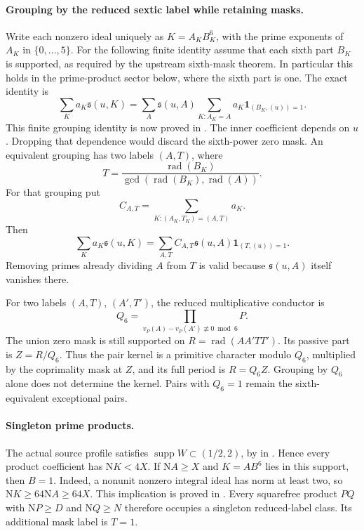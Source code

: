 \documentclass[11pt]{article}
\newcommand{\Nm}{\mathrm N}
\newcommand{\rad}{\operatorname{rad}}
\begin{document}
\paragraph{Grouping by the reduced sextic label while retaining masks.}
Write each nonzero ideal uniquely as \(K=A_K B_K^6\), with the
prime exponents of \(A_K\) in \(\{0,\ldots,5\}\).
For the following finite identity assume that each sixth part
\(B_K\) is supported, as required by the upstream sixth-mask theorem.
In particular this holds in the prime-product sector below, where
the sixth part is one. The exact identity is
\[
 \sum_K a_K\mathfrak s(u,K)
 =\sum_A\mathfrak s(u,A)
       \sum_{K:A_K=A}a_K\mathbf1_{(B_K,(u))=1}.
\]
This finite grouping identity is now proved in
.
The inner coefficient depends on \(u\). Dropping that dependence
would discard the sixth-power zero mask.
An equivalent grouping has two labels \((A,T)\), where
\[
 T=\frac{\rad(B_K)}{\gcd(\rad(B_K),\rad(A))}.
\]
For that grouping put
\[
 C_{A,T}=\sum_{K:(A_K,T_K)=(A,T)}a_K.
\]
Then
\[
 \sum_K a_K\mathfrak s(u,K)
 =\sum_{A,T}C_{A,T}\mathfrak s(u,A)
                    \mathbf1_{(T,(u))=1}.
\]
Removing primes already dividing \(A\) from \(T\) is valid because
\(\mathfrak s(u,A)\) itself vanishes there.

For two labels \((A,T)\), \((A',T')\), the reduced multiplicative
conductor is
\[
 Q_6=\prod_{v_P(A)-v_P(A')\not\equiv0\bmod6}P.
\]
The union zero mask is still supported on
\(R=\rad(AA'TT')\). Its passive part is \(Z=R/Q_6\).
Thus the pair kernel is a primitive character modulo \(Q_6\),
multiplied by the coprimality mask at \(Z\), and its full period is
\(R=Q_6Z\). Grouping by \(Q_6\) alone does not determine the kernel.
Pairs with \(Q_6=1\) remain the sixth-equivalent exceptional pairs.

\paragraph{Singleton prime products.}
The actual source profile satisfies
\(\operatorname{supp}W\subset(1/2,2)\), by
in .
Hence every product coefficient has \(\Nm K<4X\).
If \(\Nm A\ge X\) and \(K=A B^6\) lies in this support, then
\(B=1\). Indeed, a nonunit nonzero integral ideal has norm at least
two, so \(\Nm K\ge64\Nm A\ge64X\).
This implication is proved in
.
Every squarefree product \(PQ\) with \(\Nm P\ge D\) and
\(\Nm Q\ge N\) therefore occupies a singleton reduced-label class.
Its additional mask label is \(T=1\).
\end{document}
